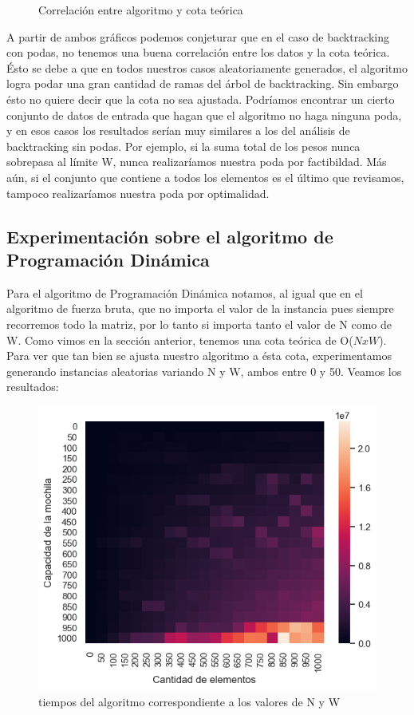 \begin{figure}[!htb]
\begin{minipage}{0.5\textwidth}
     \caption{Correlación entre algoritmo y cota teórica}
   \end{minipage}
\end{figure}

A partir de ambos gráficos podemos conjeturar que en el caso de backtracking con podas, no tenemos una buena correlación entre los datos y la cota teórica. Ésto se debe a que en todos nuestros casos aleatoriamente generados, el algoritmo logra podar una gran cantidad de ramas del árbol de backtracking. Sin embargo ésto no quiere decir que la cota no sea ajustada. Podríamos encontrar un cierto conjunto de datos de entrada que hagan que el algoritmo no haga ninguna poda, y en esos casos los resultados serían muy similares a los del análisis de backtracking sin podas. Por ejemplo, si la suma total de los pesos nunca sobrepasa al límite W, nunca realizaríamos nuestra poda por factibildad. Más aún, si el conjunto que contiene a todos los elementos es el último que revisamos, tampoco realizaríamos nuestra poda por optimalidad.


\subsection{Experimentación sobre el algoritmo de Programación Dinámica}
Para el algoritmo de Programación Dinámica notamos, al igual que en el algoritmo de fuerza bruta, que no importa el valor de la instancia pues siempre recorremos todo la matriz, por lo tanto si importa tanto el valor de N como de W. Como vimos en la sección anterior, tenemos una cota teórica de O($NxW$). Para ver que tan bien se ajusta nuestro algoritmo a ésta cota, experimentamos generando instancias aleatorias variando N y W, ambos entre 0 y 50. Veamos los resultados:

\begin{figure}[!htb]
   \begin{minipage}{1.0\textwidth}
     \centering
     \includegraphics[width=1\linewidth]{img/heatmap}
     \caption{tiempos del algoritmo correspondiente a los valores de N y W}
   \end{minipage}
\end{figure}

